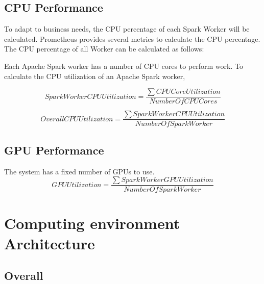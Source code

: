 \subsection{CPU Performance}

To adapt to business needs, the CPU percentage of each Spark Worker will be calculated. Prometheus provides several metrics to calculate the CPU percentage. The CPU percentage of all Worker can be calculated as follows:

Each Apache Spark worker has a number of CPU cores to perform work. To calculate the CPU utilization of an Apache Spark worker,

\begin{equation}
SparkWorkerCPUUtilization = \dfrac{\sum CPUCoreUtilization}{NumberOfCPUCores}
\label{eq:formel}
\end{equation}

\begin{equation}
OverallCPUUtilization = \dfrac{\sum SparkWorkerCPUUtilization}{NumberOfSparkWorker}
\label{eq:formel}
\end{equation}

\subsection{GPU Performance}
The system has a fixed number of GPUs to use.
\begin{equation}
GPUUtilization = \dfrac{\sum SparkWorkerGPUUtilization}{NumberOfSparkWorker}
\label{eq:formel}
\end{equation}


\section{Computing environment Architecture}


\subsection{Overall}
\label{subsec:05_arch_overall}

